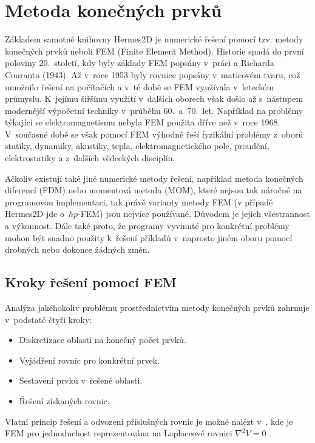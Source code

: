 \section{Metoda konečných prvků}
Základem samotné knihovny Hermes2D je numerické řešení pomocí tzv. metody konečných prvků neboli FEM (Finite Element Method). Historie spadá do první poloviny 20.~století, kdy byly základy FEM popsány v~práci a Richarda Couranta (1943). Až v~roce 1953 byly rovnice popsány v~maticovém tvaru, což umožnilo řešení na počítačích a v~té době se FEM využívala v~leteckém průmyslu. K~jejímu šiřšímu využití v~dalších oborech však došlo až s~nástupem modernější výpočetní techniky v~průběhu 60.~a~70.~let. Například na problémy týkající se elektromagnetismu nebyla FEM použita dříve než v~roce 1968. V~současné době se však pomocí FEM výhodně řeší fyzikální problémy z~oborů statiky, dynamiky, akustiky, tepla, elektromagnetického pole, proudění, elektrostatiky a z~dalších vědeckých disciplín. 

Ačkoliv existují také jiné numerické metody řešení, například metoda konečných diferencí (FDM) nebo momentová metoda (MOM), které nejsou tak náročné na programovou implementaci, tak právě varianty metody FEM (v případě Hermes2D jde o~$hp$-FEM) jsou nejvíce používané. Důvodem je jejich všestrannost a výkonnost. Dále také proto, že programy vyvinuté pro konkrétní problémy mohou být snadno použity k~řešení příkladů v~naprosto jiném oboru pomocí drobných nebo dokonce žádných změn.

\subsection{Kroky řešení pomocí FEM}
Analýza jakéhokoliv problému prostřednictvím metody konečných prvků zahrnuje v~podstatě čtyři kroky:
\begin{itemize}
\item {Diskretizace oblasti na konečný počet prvků.}
\item {Vyjádření rovnic pro konkrétní prvek.}
\item {Sestavení prvků v~řešené oblasti.}
\item {Řešení získaných rovnic.}
\end{itemize}
Vlatní princip řešení a odvození příslušných rovnic je možné nalézt v~\cite[kap. 6.2]{num}, kde je FEM pro jednoduchost reprezentována na Laplaceově rovnici $\nabla^{2}V = 0$ .

